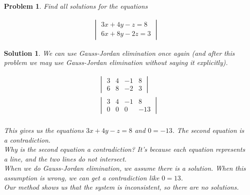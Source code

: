 \documentclass{article}
\newtheorem{problem}{Problem}
\newtheorem*{solution}{Solution}
\begin{document}
\begin{problem}
Find all solutions for the equations

\begin{align*}
\begin{vmatrix}
3x + 4y - z = 8 \\
6x + 8y - 2z = 3
\end{vmatrix}
\end{align*}

\end{problem}

\begin{solution}

We can use Gauss-Jordan elimination once again (and after this problem we may use Gauss-Jordan elimination without saying it explicitly).

\begin{align*}
&\begin{vmatrix}
3 & 4 & -1 & 8 \\ 
6 & 8 & -2 & 3 
\end{vmatrix} \\
&\begin{vmatrix}
3 & 4 & -1 & 8 \\ 
0 & 0 & 0 & -13 
\end{vmatrix} \\
\end{align*}

This gives us the equations $3x + 4y - z = 8$ and $0 = -13$. The second equation is a contradiction. \\

Why is the second equation a contradiction? It's because each equation represents a line, and the two lines do not intersect. \\

When we do Gauss-Jordan elimination, we assume there is a solution. When this assumption is wrong, we can get a contradiction like $0 = 13$. \\

Our method shows us that the system is inconsistent, so there are no solutions.

\end{solution}
\end{document}
